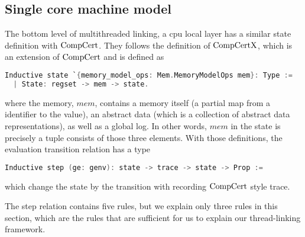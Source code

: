 

\subsection{Single core machine model}
\label{chapter:linking:subsec:cpu-local-layer-interface}

The bottom level of multithreaded linking, a cpu local layer has a similar state definition with $\mathrm{CompCert}$. 
They follows the definition of $\mathrm{CompCertX}$, 
which is an extension of $\mathrm{CompCert}$ and is defined as
\begin{lstlisting}[language=C]
Inductive state `{memory_model_ops: Mem.MemoryModelOps mem}: Type :=
  | State: regset -> mem -> state.
\end{lstlisting}
where the memory, $mem$, contains a memory itself (a partial map from a identifier to the value), an abstract data (which is a collection of abstract data representations), as well as
a global log.
In other words, 
$mem$ in the state is precisely a tuple consists of those three elements.
With those definitions, the evaluation transition relation has a type
\begin{lstlisting}[language=C]
  Inductive step (ge: genv): state -> trace -> state -> Prop :=
\end{lstlisting}
which change the state by the transition with recording $\mathrm{CompCert}$ style trace. 

The step relation contains five rules, 
but we explain only three rules in this section, which are the rules 
that are sufficient for us to explain our thread-linking framework.

